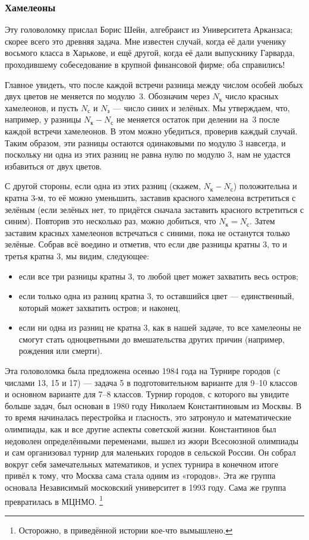 \subsubsection*{Хамелеоны}

Эту головоломку прислал Борис Шейн, алгебраист из Университета Арканзаса; скорее всего это древняя задача.
Мне известен случай, когда её дали ученику восьмого класса в Харькове,
и ещё другой, когда её дали выпускнику Гарварда, проходившему собеседование в крупной финансовой фирме;
оба справились!

Главное увидеть, что после каждой встречи разница между числом особей любых двух цветов не меняется по модулю~3.
Обозначим через $N_{\text{к}}$ число красных хамелеонов, и пусть
$N_{\text{с}}$ и $N_{\text{з}}$ --- число синих и зелёных.
Мы утверждаем, что, например, у разницы $N_{\text{к}} - N_{\text{с}}$ не меняется остаток при делении на~$3$ после каждой встречи хамелеонов.
В этом можно убедиться, проверив каждый случай.
Таким образом, эти разницы остаются одинаковыми по модулю 3 навсегда, и поскольку ни одна из этих разниц не равна нулю по модулю 3, нам не удастся избавиться от двух цветов.

С другой стороны, если одна из этих разниц (скажем, $N_{\text{к}} - N_{\text{с}}$) положительна и кратна $3$-м, то её можно уменьшить, заставив красного хамелеона встретиться с зелёным (если зелёных нет, то придётся сначала заставить красного встретиться с синим).
Повторив это несколько раз, можно добиться, что $N_{\text{к}} = N_{\text{с}}$.
Затем заставим красных хамелеонов встречаться с синими, пока не останутся только зелёные.
Собрав всё воедино и отметив, что если две разницы кратны $3$, то и третья кратна $3$, мы видим, следующее:
\begin{itemize}
\item если все три разницы кратны 3, то любой цвет может захватить весь остров;
\item если только одна из разниц кратна 3, то оставшийся цвет --- единственный, который может захватить остров; и наконец,
\item если ни одна из разниц не кратна 3, как в нашей задаче, то все хамелеоны не смогут стать одноцветными до вмешательства других причин (например, рождения или смерти).
\end{itemize}

Эта головоломка была предложена осенью 1984 года на Турнире городов (с числами 13, 15 и 17) --- задача 5 в подготовительном варианте для 9--10 классов и основном варианте для 7--8 классов.
Турнир городов, с которого вы увидите больше задач, был основан в 1980 году Николаем Константиновым из Москвы.
В то время начиналась перестройка и гласность, это затронуло и математические олимпиады, как и все другие аспекты советской жизни.
Константинов был недоволен определёнными переменами, вышел из жюри Всесоюзной олимпиады и сам организовал турнир для маленьких городов в сельской России.
Он собрал вокруг себя замечательных математиков, и успех турнира в конечном итоге привёл к тому, что Москва сама стала одним из «городов».
Эта же группа основала Независимый московский университет в 1993 году.
Сама же группа превратилась в МЦНМО.%
\footnote{Осторожно, в приведённой истории кое-что вымышлено.\pr}

